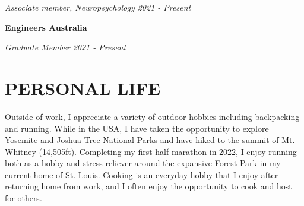 \documentclass{article}
\begin{document}
  \textit{Associate member, Neuropsychology \hfill 2021 - Present}

  \medbreak

  {\textbf{Engineers Australia}}

  \textit{Graduate Member \hfill 2021 - Present}

  \section*{\centering\uppercase{Personal Life}}

  Outside of work, I appreciate a variety of outdoor hobbies including backpacking and running. While in the USA, I have taken the opportunity to explore Yosemite and Joshua Tree National Parks and have hiked to the summit of Mt. Whitney (14,505ft). Completing my first half-marathon in 2022, I enjoy running both as a hobby and stress-reliever around the expansive Forest Park in my current home of St. Louis. Cooking is an everyday hobby that I enjoy after returning home from work, and I often enjoy the opportunity to cook and host for others.
\end{document}
